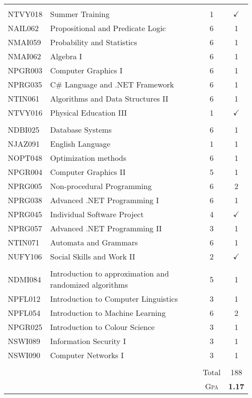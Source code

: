\documentclass[a4paper,10pt]{article}
\begin{document}
\begin{center}
\begin{supertabular}{l l c c}
\hline\\

NTVY018 & Summer Training & 1 & $\checkmark$\\
NAIL062 & Propositional and Predicate Logic & 6 & 1\\
NMAI059 & Probability and Statistics & 6 & 1\\
NMAI062 & Algebra I & 6 & 1\\
NPGR003 & Computer Graphics I & 6 & 1\\
NPRG035 & C\# Language and .NET Framework & 6 & 1\\
NTIN061 & Algorithms and Data Structures II & 6 & 1\\
NTVY016 & Physical Education III & 1 & $\checkmark$\\

\hline\\

NDBI025 & Database Systems & 6 & 1\\
NJAZ091 & English Language & 1 & 1\\
NOPT048 & Optimization methods & 6 & 1\\
NPGR004 & Computer Graphics II & 5 & 1\\
NPRG005 & Non-procedural Programming & 6 & 2\\
NPRG038 & Advanced .NET Programming I & 6 & 1\\
NPRG045 & Individual Software Project & 4 & $\checkmark$\\
NPRG057 & Advanced .NET Programming II & 3 & 1\\
NTIN071 & Automata and Grammars & 6 & 1\\
NUFY106 & Social Skills and Work II & 2 & $\checkmark$\\

\hline\\

NDMI084 & Introduction to approximation and randomized algorithms & 5 & 1\\
NPFL012 & Introduction to Computer Linguistics & 3 & 1\\
NPFL054 & Introduction to Machine Learning & 6 & 2\\
NPGR025 & Introduction to Colour Science & 3 & 1\\
NSWI089 & Information Security I & 3 & 1\\
NSWI090 & Computer Networks I & 3 & 1\\

 
\\
& & Total & 188\\
& &\textsc{Gpa} & \textbf{1.17}\\
\end{supertabular}
\end{center}
\end{document}
